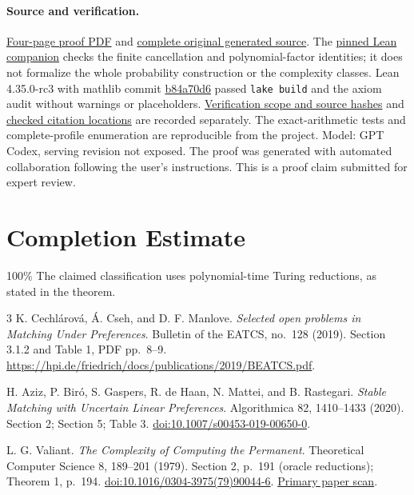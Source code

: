 \documentclass[11pt]{article}
\begin{document}
\paragraph{Source and verification.}
\href{https://github.com/jbaelaw/compact-indifference-stability/blob/10b2dac3c6addbd32205f328c222b4c20a48b52b/paper/Proof.pdf}{Four-page proof PDF}
and \href{https://github.com/jbaelaw/compact-indifference-stability/blob/10b2dac3c6addbd32205f328c222b4c20a48b52b/paper/Proof.tex}{complete original generated source}.
The \href{https://github.com/jbaelaw/compact-indifference-stability/tree/10b2dac3c6addbd32205f328c222b4c20a48b52b/lean}{pinned Lean companion}
checks the finite cancellation and polynomial-factor identities;
it does not formalize the whole probability construction or the complexity classes.
Lean 4.35.0-rc3 with mathlib commit
\href{https://github.com/leanprover-community/mathlib4/tree/b84a70d6a5ed793cc46184160f4d4188d8c825fb}{b84a70d6}
passed \texttt{lake build} and the axiom audit without warnings or placeholders.
\href{https://github.com/jbaelaw/compact-indifference-stability/blob/10b2dac3c6addbd32205f328c222b4c20a48b52b/verification/LeanVerification.json}{Verification scope and source hashes}
and \href{https://github.com/jbaelaw/compact-indifference-stability/blob/10b2dac3c6addbd32205f328c222b4c20a48b52b/paper/CitationAudit.json}{checked citation locations}
are recorded separately. The exact-arithmetic tests and complete-profile enumeration
are reproducible from the project. Model: GPT Codex, serving revision not exposed.
The proof was generated with automated collaboration following the user's instructions.
This is a proof claim submitted for expert review.

\section*{Completion Estimate}
100\%
The claimed classification uses polynomial-time Turing reductions, as stated in the theorem.

\begin{thebibliography}{3}
\small
{}
K. Cechl\'arov\'a, \'A. Cseh, and D. F. Manlove.
\emph{Selected open problems in Matching Under Preferences}.
Bulletin of the EATCS, no.~128 (2019).
Section 3.1.2 and Table 1, PDF pp.~8--9.
\url{https://hpi.de/friedrich/docs/publications/2019/BEATCS.pdf}.

H. Aziz, P. Bir\'o, S. Gaspers, R. de Haan, N. Mattei, and B. Rastegari.
\emph{Stable Matching with Uncertain Linear Preferences}.
Algorithmica 82, 1410--1433 (2020).
Section 2; Section 5; Table 3.
\href{https://doi.org/10.1007/s00453-019-00650-0}{doi:10.1007/s00453-019-00650-0}.

L. G. Valiant. \emph{The Complexity of Computing the Permanent}.
Theoretical Computer Science 8, 189--201 (1979).
Section 2, p.~191 (oracle reductions); Theorem 1, p.~194.
\href{https://doi.org/10.1016/0304-3975(79)90044-6}{doi:10.1016/0304-3975(79)90044-6}.
\href{https://www.math.cmu.edu/users/af1p/Teaching/MCC17/Papers/permanent.pdf}{Primary paper scan}.
\end{thebibliography}
\end{document}
